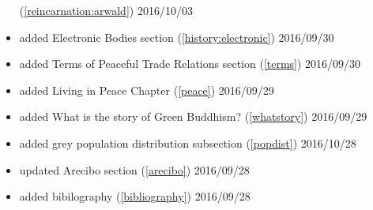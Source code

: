 \documentclass[10pt]{report}
\begin{document}
\begin{titlepage}
\begin{itemize}
(\ref{reincarnation:arwald}) 2016/10/03
  \item added Electronic Bodies section (\ref{history:electronic}) 2016/09/30
  \item added Terms of Peaceful Trade Relations section (\ref{terms}) 2016/09/30
  \item added Living in Peace Chapter (\ref{peace}) 2016/09/29
  \item added What is the story of Green Buddhism? (\ref{whatstory}) 2016/09/29
  \item added grey population distribution subsection (\ref{popdist})
2016/10/28
 \item updated Arecibo section (\ref{arecibo}) 2016/09/28
 \item added bibilography (\ref{bibliography}) 2016/09/28
\end{itemize}
\end{titlepage}
\tableofcontents








 
\printbibliography{}\label{bibliography}
\end{document}
